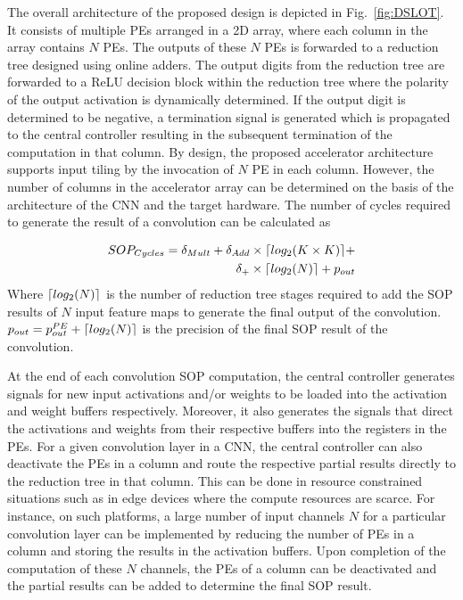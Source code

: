 \documentclass[conference]{IEEEtran}
\DeclarePairedDelimiter{\ceil}{\lceil}{\rceil}
\begin{document}
The overall architecture of the proposed design is depicted in Fig.~\ref{fig:DSLOT}. It consists of multiple PEs arranged in a 2D array, where each column in the array contains \(N\) PEs. The outputs of these \(N\) PEs is forwarded to a reduction tree designed using online adders. The output digits from the reduction tree are forwarded to a ReLU decision block within the reduction tree where the polarity of the output activation is dynamically determined. If the output digit is determined to be negative, a termination signal is generated which is propagated to the central controller resulting in the subsequent termination of the computation in that column. By design, the proposed accelerator architecture supports input tiling by the invocation of \(N\) PE in each column. However, the number of columns in the accelerator array can be determined on the basis of the architecture of the CNN and the target hardware. The number of cycles required to generate the result of a convolution can be calculated as

\begin{equation} \label{eq: cyc_SOP}
    \begin{split}
        SOP_{Cycles} = \delta_{Mult} + \delta_{Add} \times \ceil{log_{2}(K \times K)} + \\
        \delta_{+} \times \ceil{log_{2}(N)} + p_{out}
    \end{split}
\end{equation}
Where \(\ceil{log_{2}(N)}\) is the number of reduction tree stages required to add the SOP results of $N$ input feature maps to generate the final output of the convolution. \(p_{out} = p^{PE}_{out} + \ceil{log_{2}(N)}\) is the precision of the final SOP result of the convolution.

At the end of each convolution SOP computation, the central controller generates signals for new input activations and/or weights to be loaded into the activation and weight buffers respectively. Moreover, it also generates the signals that direct the activations and weights from their respective buffers into the registers in the PEs. For a given convolution layer in a CNN, the central controller can also deactivate the PEs in a column and route the respective partial results directly to the reduction tree in that column. This can be done in resource constrained situations such as in edge devices where the compute resources are scarce. For instance, on such platforms, a large number of input channels \(N\) for a particular convolution layer can be implemented by reducing the number of PEs in a column and storing the results in the activation buffers. Upon completion of the computation of these \(N\) channels, the PEs of a column can be deactivated and the partial results can be added to determine the final SOP result. 
\end{document}
